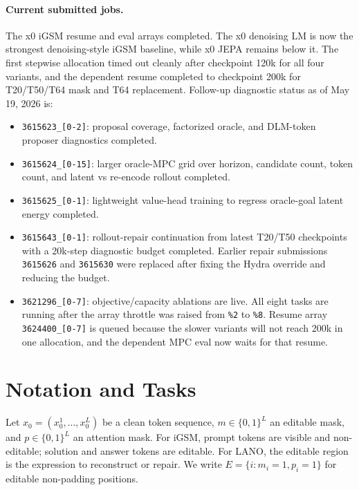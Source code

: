 \documentclass[11pt]{article}
\begin{document}
\paragraph{Current submitted jobs.}
The x0 iGSM resume and eval arrays completed.  The x0 denoising LM is now the
strongest denoising-style iGSM baseline, while x0 JEPA remains below it.  The
first stepwise allocation timed out cleanly after checkpoint 120k for all four
variants, and the dependent resume completed to checkpoint 200k for T20/T50/T64
mask and T64 replacement.  Follow-up diagnostic status as of May 19, 2026 is:
\begin{itemize}[leftmargin=*]
\item \texttt{3615623\_[0-2]}: proposal coverage, factorized oracle, and
  DLM-token proposer diagnostics completed.
\item \texttt{3615624\_[0-15]}: larger oracle-MPC grid over horizon,
  candidate count, token count, and latent vs re-encode rollout completed.
\item \texttt{3615625\_[0-1]}: lightweight value-head training to regress
  oracle-goal latent energy completed.
\item \texttt{3615643\_[0-1]}: rollout-repair continuation from latest T20/T50
  checkpoints with a 20k-step diagnostic budget completed.  Earlier repair submissions
  \texttt{3615626} and \texttt{3615630} were replaced after fixing the Hydra
  override and reducing the budget.
\item \texttt{3621296\_[0-7]}: objective/capacity ablations are live.  All
  eight tasks are running after the array throttle was raised from
  \texttt{\%2} to \texttt{\%8}.  Resume array
  \texttt{3624400\_[0-7]} is queued because the slower variants will not reach
  200k in one allocation, and the dependent MPC eval now waits for that resume.
\end{itemize}

\section{Notation and Tasks}

Let $x_0 = (x_0^1,\ldots,x_0^L)$ be a clean token sequence, $m \in \{0,1\}^L$
an editable mask, and $p \in \{0,1\}^L$ an attention mask.  For iGSM, prompt
tokens are visible and non-editable; solution and answer tokens are editable.
For LANO, the editable region is the expression to reconstruct or repair.  We
write $E=\{i:m_i=1,p_i=1\}$ for editable non-padding positions.
\end{document}
